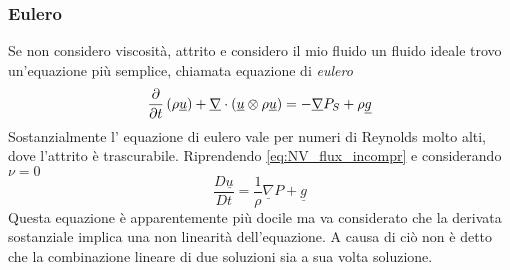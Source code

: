 \subsubsection{Eulero}
Se non considero viscosità, attrito e considero il mio fluido un fluido ideale trovo un'equazione più semplice, chiamata equazione di \emph{eulero}
\begin{equation}
  \frac{\partial}{\partial t}\left( \rho \underline{u}\right)  + \underline{\nabla}\cdot \left( \underline{u} \otimes \rho \underline{u}\right) = - \underline{\nabla} P_S +\rho \underline{g}
\end{equation}
Sostanzialmente l' equazione di eulero vale per numeri di Reynolds molto alti, dove l'attrito è trascurabile. Riprendendo \cref{eq:NV_flux_incompr} e considerando $ \nu =0 $ 
\begin{equation}
  \frac{D \underline{u}}{Dt}=\frac{1}{\rho }\underline{\nabla}P +\underline{g}
\end{equation}
Questa equazione è apparentemente più docile ma va considerato che la derivata sostanziale implica una non linearità dell'equazione.
A causa di ciò non è detto che la combinazione lineare di due soluzioni sia a sua volta soluzione.
